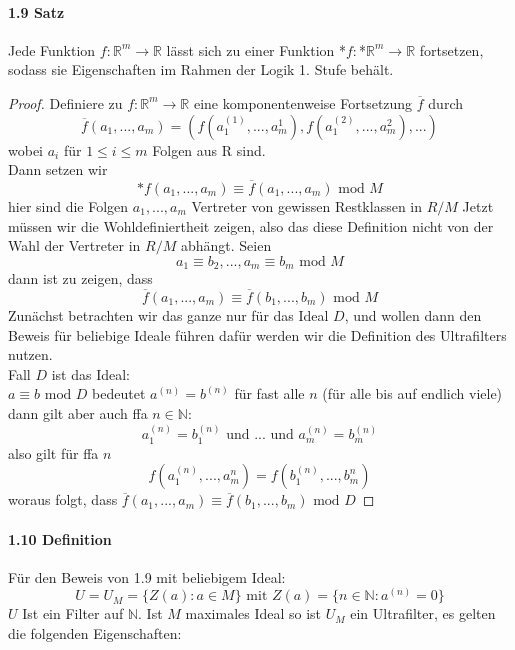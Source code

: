 \documentclass[a4paper]{article}
\begin{document}
\paragraph{1.9 Satz} 
Jede Funktion $f:\mathbb{R}^m \to \mathbb{R} $ lässt sich zu einer 
Funktion *$f:$*$\mathbb{R}^m \to \mathbb{R}$ fortsetzen, sodass sie Eigenschaften im Rahmen 
der Logik 1. Stufe behält.
\begin{proof}
      Definiere zu $f:\mathbb{R}^m \to \mathbb{R} $ eine komponentenweise Fortsetzung $ \overline{f} $ durch
      $$ \overline{f}(a_1,...,a_m) = (f(a^{(1)}_1,...,a^{1}_m), f(a^{(2)}_1,...,a^{2}_m),...) $$
      wobei $ a_i $ für $ 1 \leqslant i \leqslant m $ Folgen aus R sind. \\
      Dann setzen wir 
      $$ \text{*}f(a_1,...,a_m) \equiv \overline{f}(a_1,...,a_m) \text{ mod } M $$
      hier sind die Folgen $ a_1,...,a_m $ Vertreter von gewissen Restklassen in $ R/M $
      Jetzt müssen wir die Wohldefiniertheit zeigen, also das diese Definition nicht von der Wahl 
      der Vertreter in $ R/M $ abhängt. Seien 
      $$ a_1 \equiv b_2,...,a_m \equiv b_m \text{ mod } M $$ 
      dann ist zu zeigen, dass
      $$ \overline{f}(a_1,...,a_m) \equiv \overline{f}(b_1,...,b_m) \text{ mod } M $$
      Zunächst betrachten wir das ganze nur für das Ideal $ D $, und wollen dann den Beweis für beliebige Ideale führen
      dafür werden wir die Definition des Ultrafilters nutzen. \\
      Fall $ D $ ist das Ideal: \\
      $ a \equiv b \text{ mod } D $ bedeutet $ a^{(n)} = b^{(n)} $ für fast alle $ n $ (für alle bis auf endlich viele)
      dann gilt aber auch ffa $ n \in \mathbb{N} $:
      $$ a^{(n)}_1 = b^{(n)}_1 \text{ und }...\text{ und } a^{(n)}_m = b^{(n)}_m $$ 
      also gilt für ffa $ n $ 
      $$  f(a^{(n)}_1,...,a^{n}_m) = f(b^{(n)}_1,...,b^{n}_m) $$
      woraus folgt, dass $ \overline{f}(a_1,...,a_m) \equiv \overline{f}(b_1,...,b_m) \text{ mod } D $

\end{proof}

\paragraph{1.10 Definition}  Für den Beweis von 1.9 mit beliebigem Ideal: 
$$ U = U_M = \{Z(a): a \in M\} \text{ mit } Z(a) = \{n \in \mathbb{N}: a^{(n)} = 0\} $$
$U $ Ist ein Filter auf $ \mathbb{N} $. Ist $ M $ maximales Ideal so ist $ U_M $ ein Ultrafilter, es gelten die folgenden Eigenschaften: 
\end{document}
